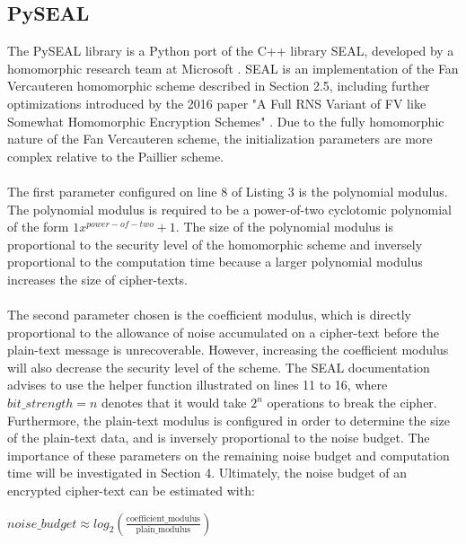 \documentclass[10pt, a4paper]{article}
\begin{document}
	\subsection{PySEAL}
	The PySEAL library is a Python port of the C++ library SEAL, developed by a homomorphic research team at Microsoft \cite{PySEAL} \cite{sealcrypto}. SEAL is an implementation of the Fan Vercauteren homomorphic scheme described in Section 2.5, including further optimizations introduced by the 2016 paper "A Full RNS Variant of FV like Somewhat Homomorphic Encryption Schemes" \cite{bajard2016full}. Due to the fully homomorphic nature of the Fan Vercauteren scheme, the initialization parameters are more complex relative to the Paillier scheme. 
	\paragraph{}The first parameter configured on line 8 of Listing 3 is the polynomial modulus. The polynomial modulus is required to be a power-of-two cyclotomic polynomial of the form $1x^{power-of-two} + 1$.  The size of the polynomial modulus is proportional to the security level of the homomorphic scheme and inversely proportional to the computation time because a larger polynomial modulus increases the size of cipher-texts. \paragraph{}The second parameter chosen is the coefficient modulus, which is directly proportional to the allowance of noise accumulated on a cipher-text before the plain-text message is unrecoverable. However, increasing the coefficient modulus will also decrease the security level of the scheme. The SEAL documentation advises to use the helper function illustrated on lines 11 to 16, where $bit\_strength = n$ denotes that it would take $2^n$ operations to break the cipher. Furthermore, the plain-text modulus is configured in order to determine the size of the plain-text data, and is inversely proportional to the noise budget. The importance of these parameters on the remaining noise budget and computation time will be investigated in Section 4. Ultimately, the noise budget of an encrypted cipher-text can be estimated with:
	
		 {\centering \Medium \(
        noise\_budget \approx log_2(\frac{\mathrm{coefficient\_modulus}}{\mathrm{plain\_modulus}})
        
    \)\par}
    
\end{document}
